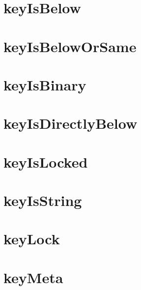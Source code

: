 \let\mypdfximage\pdfximage\def\pdfximage{\immediate\mypdfximage}\documentclass[twoside]{book}
\newcommand{\+}{\discretionary{\mbox{\scriptsize$\hookleftarrow$}}{}{}}
\begin{document}
\chapter{key\+Is\+Below}
\label{doc_contrib_api_reviews_core_keyIsBelow_md}

\chapter{key\+Is\+Below\+Or\+Same}
\label{doc_contrib_api_reviews_core_keyIsBelowOrSame_md}

\chapter{key\+Is\+Binary}
\label{doc_contrib_api_reviews_core_keyIsBinary_md}

\chapter{key\+Is\+Directly\+Below}
\label{doc_contrib_api_reviews_core_keyIsDirectlyBelow_md}

\chapter{key\+Is\+Locked}
\label{doc_contrib_api_reviews_core_keyIsLocked_md}

\chapter{key\+Is\+String}
\label{doc_contrib_api_reviews_core_keyIsString_md}

\chapter{key\+Lock}
\label{doc_contrib_api_reviews_core_keyLock_md}

\chapter{key\+Meta}
\label{doc_contrib_api_reviews_core_keyMeta_md}

\end{document}
